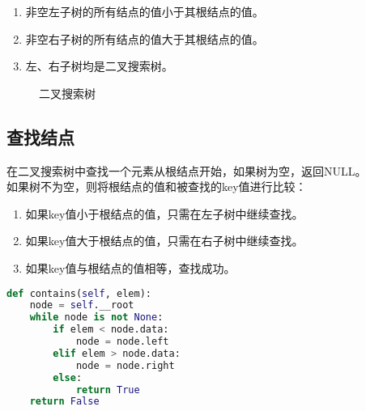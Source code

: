 \begin{enumerate}
	\item 非空左子树的所有结点的值小于其根结点的值。
	\item 非空右子树的所有结点的值大于其根结点的值。
	\item 左、右子树均是二叉搜索树。
\end{enumerate}

\begin{figure}[H]
	\centering
	\caption{二叉搜索树}
\end{figure}

\vspace{0.5cm}

\subsection{查找结点}

在二叉搜索树中查找一个元素从根结点开始，如果树为空，返回NULL。\\

如果树不为空，则将根结点的值和被查找的key值进行比较：

\begin{enumerate}
	\item 如果key值小于根结点的值，只需在左子树中继续查找。
	\item 如果key值大于根结点的值，只需在右子树中继续查找。
	\item 如果key值与根结点的值相等，查找成功。
\end{enumerate}


\begin{lstlisting}[language=Python]
def contains(self, elem):
	node = self.__root
	while node is not None:
		if elem < node.data:
			node = node.left
		elif elem > node.data:
			node = node.right
		else:
			return True
	return False
\end{lstlisting}

